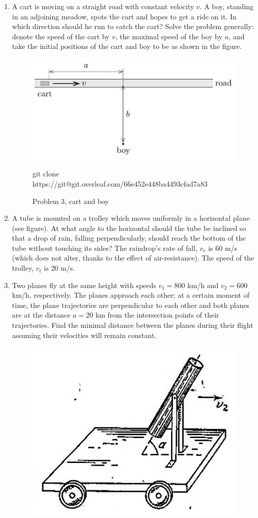 \documentclass{article}
\begin{document}
\begin{enumerate}
    \item A cart is moving on a straight road with constant velocity $v$. A boy, standing in an adjoining meadow, spots the cart and hopes to get a ride on it. In which direction should he run to catch the cart? Solve the problem generally: denote the speed of the cart by $v$, the maximal speed of the boy by $u$, and take the initial positions of the cart and boy to be as shown in the figure.
\begin{figure}
    \centering
    \includegraphics[width=0.5\linewidth]{assets/cart and boy}
    \caption{Problem 3, cart and boy}git clone https://git@git.overleaf.com/66e452e448ba4493cfad7a83
    \label{fig:enter-label}
\end{figure}
    \item A tube is mounted on a trolley which moves uniformly in a horizontal plane (see figure). At what angle to the horizontal should the tube be inclined so that a drop of rain, falling perpendicularly, should reach the bottom of the tube without touching its sides? The raindrop's rate of fall, $v_r$ is $60$ m/s (which does not alter, thanks to the effect of air-resistance). The speed of the trolley, $v_t$ is $20$ m/s.
    \item Two planes fly at the same height with speeds $v_1 = 800$ km/h and $v_2 = 600$ km/h, respectively. The planes approach each other; at a certain moment of time, the plane trajectories are perpendicular to each other and both planes are at the distance $a = 20$ km from the intersection points of their trajectories. Find the minimal distance between the planes during their flight assuming their velocities will remain constant.
    \begin{figure}
        \centering
        \includegraphics[width=0.5\linewidth]{assets/trolley in rain}

\end{figure}
\end{enumerate}
\end{document}
